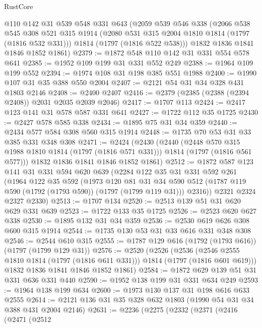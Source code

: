 \begin{lexlean}{RustCore}
\begin{coremodule}
    @110
    @142
    @31
    @539
    @548
    @331
    @643
    (@2059
      @539
      @546
      @338
      (@2066
        @538
        @545
        @308
        @521
        @315
        @1914
        (@2080 @531 @315 @2004 @1810 @1814 (@1797 (@1816 @532 @331)))
        @1814
        (@1797 (@1816 @522 @538)))
      @1832
      @1836
      @1841
      @1846
      @1852
      @1861)
@2379 := @1872 @548 @110 @142 @31 @331 @554 @578 @641
@2385 := @1952 @109 @199 @31 @331 @552 @249
@2388 := @1964 @109 @199 @552
@2394 := @1974 @108 @31 @198 @385 @551 @1988
@2400 := @1990 @107 @31 @35 @388 @550 @2004
@2407 := @2121 @54 @31 @34 @328 @431 @1803 @2146
@2408 := @2400 @2407
@2416 := @2379 (@2385 (@2388 (@2394 @2408)) @2031 @2035 @2039 @2046)
@2417 := @1707 @113
@2424 := @2417 @123 @141 @31 @578 @587 @331 @641
@2427 := @1722 @112 @35 @1725
@2430 := @2427 @578 @585 @338
@2434 := @1895 @75 @31 @34 @359
@2440 := @2434 @577 @584 @308 @560 @315 @1914
@2448 := @1735 @70 @53 @31 @33 @385 @331 @348 @308
@2471 := @2424
    (@2430
      (@2440
        (@2448 @570 @315 @1988 @1810 @1814 (@1797 (@1816 @571 @331)))
        @1814
        (@1797 (@1816 @561 @577)))
      @1832
      @1836
      @1841
      @1846
      @1852
      @1861)
@2512 := @1872
    @587
    @123
    @141
    @31
    @331
    @594
    @620
    @639
    (@2284
      @122
      @35
      @31
      @331
      @592
      @261
      (@1964
        @122
        @35
        @592
        (@1973
          @120
          @81
          @31
          @34
          @590
          @512
          (@1787 @119 @590 (@1792 (@1793 @590)) (@1797 (@1799 @119 @31)))
          @2316))
      @2321
      @2324
      @2327
      @2330)
@2513 := @1707 @134
@2520 := @2513 @139 @51 @31 @620 @629 @331 @639
@2523 := @1722 @133 @35 @1725
@2526 := @2523 @620 @627 @338
@2530 := @1895 @132 @31 @34 @359
@2536 := @2530 @619 @626 @308 @600 @315 @1914
@2544 := @1735 @130 @53 @31 @33 @616 @331 @348 @308
@2546 := @2544 @610 @315
@2555 := @1787 @129 @616 (@1792 (@1793 @616)) (@1797 (@1799 @129 @31))
@2576 := @2520
    (@2526
      (@2536 (@2546 @2555 @1810 @1814 (@1797 (@1816 @611 @331))) @1814 (@1797 (@1816 @601 @619)))
      @1832
      @1836
      @1841
      @1846
      @1852
      @1861)
@2584 := @1872 @629 @139 @51 @31 @331 @636 @331 @440
@2590 := @1952 @138 @199 @31 @331 @634 @249
@2593 := @1964 @138 @199 @634
@2600 := @1973 @130 @137 @31 @198 @616 @633 @2555
@2614 := @2121 @136 @31 @35 @328 @632 @1803 (@1990 @54 @31 @34 @388 @431 @2004 @2146)
@2631 := @2236
    (@2275
      (@2332
        (@2371
          (@2416
            (@2471
              (@2512

\end{coremodule}
\end{lexlean}
